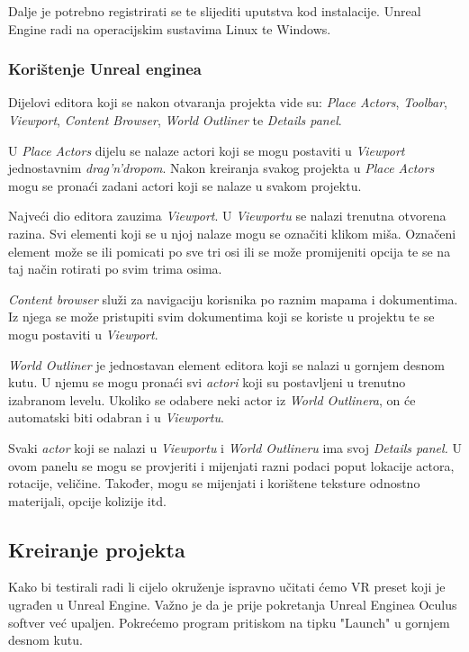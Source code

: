 \documentclass[a4paper,10pt]{article}
\begin{document}
Dalje je potrebno registrirati se te slijediti uputstva kod instalacije. Unreal
Engine radi na operacijskim sustavima Linux te Windows.

\subsubsection{Korištenje Unreal enginea}

Dijelovi editora koji se nakon otvaranja projekta vide su:
\textit{Place Actors}, \textit{Toolbar}, \textit{Viewport},
\textit{Content Browser}, \textit{World}
\textit{Outliner} te \textit{Details panel}.

U \textit{Place Actors} dijelu se nalaze actori koji se mogu postaviti u
\textit{Viewport} jednostavnim \textit{drag'n'dropom}. Nakon kreiranja svakog
projekta u \textit{Place Actors} mogu se pronaći zadani actori koji se nalaze u
svakom projektu.

Najveći dio editora zauzima \textit{Viewport}. U \textit{Viewportu} se nalazi trenutna otvorena
razina. Svi elementi koji se u njoj nalaze mogu se označiti klikom miša. Označeni
element može se ili pomicati po sve tri osi ili se može promijeniti opcija te
se na taj način rotirati po svim trima osima.

\textit{Content browser} služi za navigaciju korisnika po raznim mapama i
dokumentima.  Iz njega se može pristupiti svim dokumentima koji se koriste u
projektu te se mogu postaviti u \textit{Viewport}.

\textit{World Outliner} je jednostavan element editora koji se nalazi u gornjem
desnom kutu. U njemu se mogu pronaći svi \textit{actori} koji su postavljeni u
trenutno izabranom levelu. Ukoliko se odabere neki actor iz \textit{World
Outlinera}, on će automatski biti odabran i u \textit{Viewportu}.

Svaki \textit{actor} koji se nalazi u \textit{Viewportu} i \textit{World
Outlineru} ima svoj \textit{Details panel. }U ovom panelu se mogu se provjeriti
i mijenjati razni podaci poput lokacije actora, rotacije, veličine. Također,
mogu se mijenjati i korištene teksture odnostno materijali, opcije kolizije
itd.

\subsection{Kreiranje projekta}

Kako bi testirali radi li cijelo okruženje ispravno učitati ćemo VR preset koji
je ugrađen u Unreal Engine. Važno je da je prije pokretanja Unreal Enginea
Oculus softver već upaljen. Pokrećemo program pritiskom na tipku "Launch" u
gornjem desnom kutu.
\end{document}
